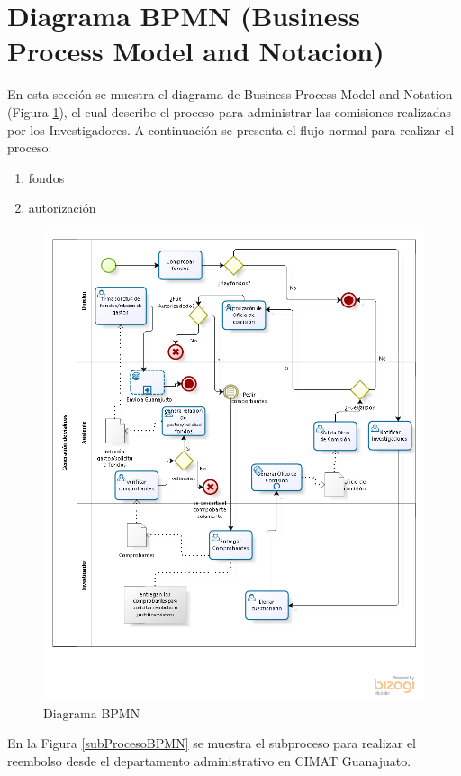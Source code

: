 \documentclass{report}
\begin{document}
    \section{Diagrama BPMN (Business Process Model and Notacion)}
    En esta sección se muestra el diagrama de Business Process Model and Notation (Figura \ref{BPMN}), el cual describe el proceso para administrar las comisiones realizadas por los Investigadores.
    A continuación se presenta el flujo normal para realizar el proceso:
    \begin{enumerate}
        \item fondos
        \item autorización
    \end{enumerate}
    	\begin{figure}
    		\begin{center}
    			\includegraphics[scale=0.70]{images/1models/comision.png}  
    			\caption{Diagrama BPMN}  		
    		\end{center}
            \label{BPMN}
    	\end{figure}
    En la Figura \ref{subProcesoBPMN} se muestra el subproceso para realizar el reembolso desde el departamento administrativo en CIMAT Guanajuato.
\end{document}
